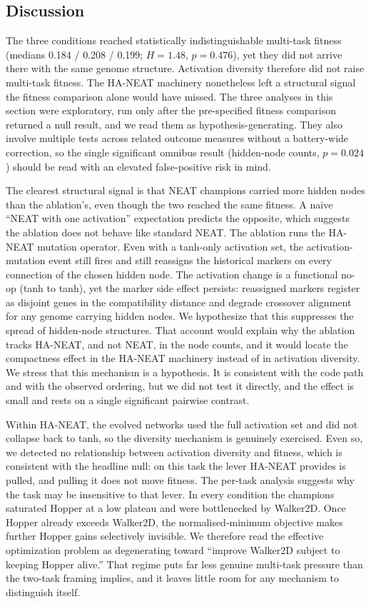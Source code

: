 \documentclass[12pt]{article}
\begin{document}
\subsection{Discussion}
\label{sec:main-discussion}

The three conditions reached statistically indistinguishable multi-task fitness (medians 0.184 / 0.208 / 0.199; $H = 1.48$, $p = 0.476$), yet they did not arrive there with the same genome structure.
Activation diversity therefore did not raise multi-task fitness. The HA-NEAT machinery nonetheless left a structural signal the fitness comparison alone would have missed.
The three analyses in this section were exploratory, run only after the pre-specified fitness comparison returned a null result, and we read them as hypothesis-generating.
They also involve multiple tests across related outcome measures without a battery-wide correction, so the single significant omnibus result (hidden-node counts, $p = 0.024$) should be read with an elevated false-positive risk in mind.

The clearest structural signal is that NEAT champions carried more hidden nodes than the ablation's, even though the two reached the same fitness.
A naive ``NEAT with one activation'' expectation predicts the opposite, which suggests the ablation does not behave like standard NEAT.
The ablation runs the HA-NEAT mutation operator.
Even with a tanh-only activation set, the activation-mutation event still fires and still reassigns the historical markers on every connection of the chosen hidden node.
The activation change is a functional no-op (tanh to tanh), yet the marker side effect persists: reassigned markers register as disjoint genes in the compatibility distance and degrade crossover alignment for any genome carrying hidden nodes.
We hypothesize that this suppresses the spread of hidden-node structures.
That account would explain why the ablation tracks HA-NEAT, and not NEAT, in the node counts, and it would locate the compactness effect in the HA-NEAT machinery instead of in activation diversity.
We stress that this mechanism is a hypothesis.
It is consistent with the code path and with the observed ordering, but we did not test it directly, and the effect is small and rests on a single significant pairwise contrast.

Within HA-NEAT, the evolved networks used the full activation set and did not collapse back to tanh, so the diversity mechanism is genuinely exercised.
Even so, we detected no relationship between activation diversity and fitness, which is consistent with the headline null: on this task the lever HA-NEAT provides is pulled, and pulling it does not move fitness.
The per-task analysis suggests why the task may be insensitive to that lever.
In every condition the champions saturated Hopper at a low plateau and were bottlenecked by Walker2D.
Once Hopper already exceeds Walker2D, the normalised-minimum objective makes further Hopper gains selectively invisible.
We therefore read the effective optimization problem as degenerating toward ``improve Walker2D subject to keeping Hopper alive.''
That regime puts far less genuine multi-task pressure than the two-task framing implies, and it leaves little room for any mechanism to distinguish itself.
\end{document}
